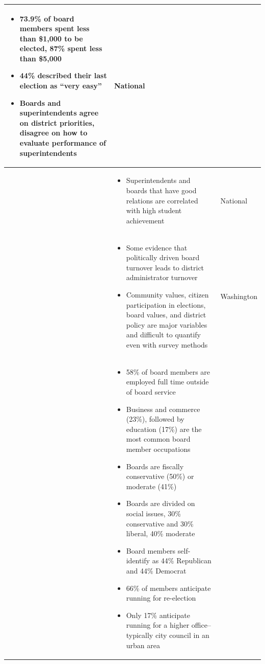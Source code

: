 \begin{small}
\begin{singlespace}
\begin{longtable}{| p{} | p{} | p{}|}
\begin{itemize}
\setlength\itemsep{-2pt}\item 73.9\% of board members spent less than \$1,000
to be elected, 87\% spent less than \$5,000 \item 44\% described their last election as ``very easy'' \item Boards and 
superintendents agree on district priorities, disagree on how to evaluate performance of superintendents
\end{itemize} \vspace{-4mm}
& National \\ \hline
\citet{speer1998reaching} & \vspace{-6mm} \begin{itemize}
 \setlength\itemsep{-2pt}\item Superintendents and boards that have good relations are correlated with high student achievement \end{itemize} \vspace{-4mm} & National \\ \hline
\citet{RefWorks:311} & \vspace{-6mm} \begin{itemize} \setlength\itemsep{-2pt}\item Some evidence that politically driven board turnover leads to district administrator turnover \item Community values, citizen participation in elections, board values, and district policy are major variables and difficult to quantify even with survey methods
 \end{itemize} \vspace{-4mm}& Washington\\ \hline
\citet{RefWorks:333} &  \vspace{-6mm} \begin{itemize} \setlength\itemsep{-2pt}
\item 58\% of board members are employed full time outside of board service \item Business and commerce (23\%), followed by education (17\%) are the most common board member occupations \item Boards are fiscally conservative (50\%) or moderate (41\%) \item Boards are divided on social issues, 30\% conservative and 30\% liberal, 40\% moderate \item Board members self-identify as 44\% Republican and 44\% Democrat \item 66\% of members anticipate running for re-election \item Only 17\% anticipate running for a higher office--typically city council in an urban area 

\end{itemize}
\end{longtable}
\end{singlespace}
\end{small}
